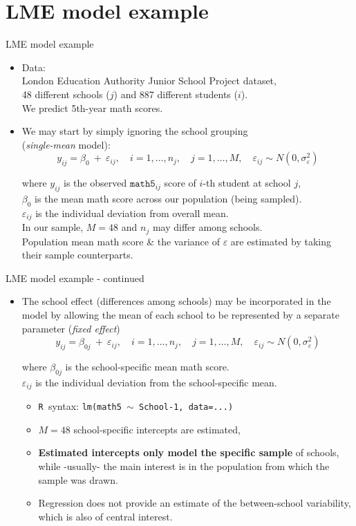 \documentclass{beamer}
\newcommand{\Rko}{\texttt{R~}}
\begin{document}
\section{LME model example}
\begin{frame}{LME model example}
\begin{itemize}
\item Data: \\London Education Authority Junior School Project
dataset, \\48 different schools ($j$) and 887 different students ($i$). \\We predict 5th-year math scores.
\medskip
\item We may start by simply ignoring the school grouping \\(\textit{single-mean} model):
$$ y_{ij} = \beta_0~+~\varepsilon_{ij}, \quad i=1,\dots,n_j,  \quad j=1,\dots, M,  \quad \varepsilon_{ij} \sim N(0,\sigma^2_{\varepsilon}) $$

where $y_{ij}$ is the observed $\texttt{math5}_{ij}$ score of $i$-th student at school $j$,\\
$\beta_0$ is the mean math score across our population (being sampled).\\
$\varepsilon_{ij}$ is the individual deviation from overall mean.\\
\medskip
In our sample, $M=48$ and $n_j$ may differ among schools.\\ 
\medskip
Population mean math score \& the variance of $\varepsilon$ are estimated by taking their sample counterparts.
\end{itemize}
\end{frame}
\begin{frame}{LME model example - continued}
\begin{itemize}
\item The school effect (differences among schools) may be incorporated in the model by allowing the mean of each school to be represented by a separate parameter (\textit{fixed effect})
$$ y_{ij} = \beta_{0j}~+~\varepsilon_{ij}, \quad i=1,\dots,n_j,  \quad j=1,\dots, M,  \quad \varepsilon_{ij} \sim N(0,\sigma^2_{\varepsilon}) $$

where $\beta_{0j}$ is the school-specific mean math score.\\
$\varepsilon_{ij}$ is the individual deviation from the school-specific mean.\\
\smallskip
\begin{itemize}
\item \Rko syntax: \texttt{lm(math5 $\sim$ School-1, data=...)}
\item $M=48$ school-specific intercepts are estimated,
\item \textbf{Estimated intercepts only model the specific sample}  of schools, while -usually- the main interest is in the population from which the sample was drawn.
\item Regression does not provide an estimate of the between-school variability, which is also of central interest.
\end{itemize}
\end{itemize}
\end{frame}
\end{document}
